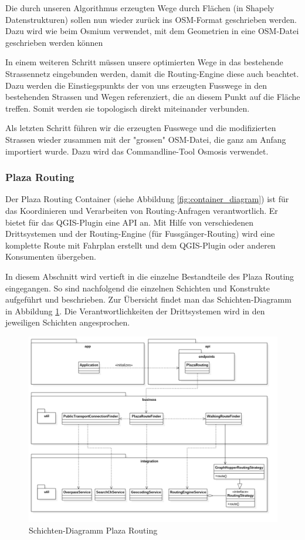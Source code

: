Die durch unseren Algorithmus erzeugten Wege durch Flächen (in Shapely Datenstrukturen) sollen nun wieder zurück ins \ac{OSM}-Format geschrieben werden. Dazu wird wie beim  Osmium verwendet, mit dem Geometrien in eine OSM-Datei geschrieben werden können

In einem weiteren Schritt müssen unsere optimierten Wege in das bestehende Strassennetz eingebunden werden, damit die Routing-Engine diese auch beachtet. Dazu werden die \glspl{Einstiegspunkt} der von uns erzeugten Fusswege in den bestehenden Strassen und Wegen referenziert, die an diesem Punkt auf die Fläche treffen. Somit werden sie topologisch direkt miteinander verbunden.

Als letzten Schritt führen wir die erzeugten Fusswege und die modifizierten Strassen wieder zusammen mit der "grossen" \ac{OSM}-Datei, die ganz am Anfang importiert wurde. Dazu wird das Commandline-Tool Osmosis \cite{osmosis} verwendet.

\subsubsection{Plaza Routing}
\label{architektur:Plaza Routing}
Der Plaza Routing Container (siehe Abbildung \ref{fig:container_diagram}) ist für das Koordinieren und Verarbeiten von Routing-Anfragen verantwortlich. Er bietet für das QGIS-Plugin eine API an. Mit Hilfe von verschiedenen Drittsystemen und der Routing-Engine (für Fussgänger-Routing) wird eine komplette Route mit Fahrplan erstellt und dem QGIS-Plugin oder anderen Konsumenten übergeben.

In diesem Abschnitt wird vertieft in die einzelne Bestandteile des Plaza Routing eingegangen. So sind nachfolgend die einzelnen Schichten und Konstrukte aufgeführt und beschrieben. Zur Übersicht findet man das Schichten-Diagramm in Abbildung \ref{fig:package_diagram_plaza_routing}. Die Verantwortlichkeiten der Drittsystemen wird in den jeweiligen Schichten angesprochen.

\begin{figure}[ht]
\centering
\includegraphics[width=1\linewidth]{projectdoc/img/package_diagram}
\caption[Schichten-Diagramm Plaza Routing]{Schichten-Diagramm Plaza Routing}
\label{fig:package_diagram_plaza_routing}
\end{figure}

